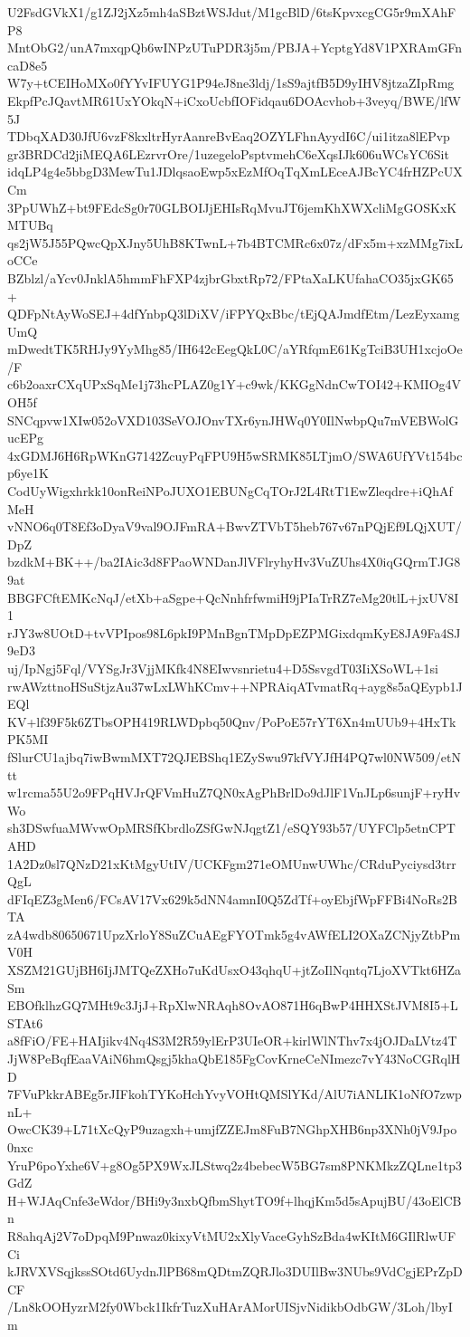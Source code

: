 U2FsdGVkX1/g1ZJ2jXz5mh4aSBztWSJdut/M1gcBlD/6tsKpvxcgCG5r9mXAhFP8
MntObG2/unA7mxqpQb6wINPzUTuPDR3j5m/PBJA+YcptgYd8V1PXRAmGFncaD8e5
W7y+tCEIHoMXo0fYYvIFUYG1P94eJ8ne3ldj/1sS9ajtfB5D9yIHV8jtzaZIpRmg
EkpfPcJQavtMR61UxYOkqN+iCxoUcbfIOFidqau6DOAcvhob+3veyq/BWE/lfW5J
TDbqXAD30JfU6vzF8kxltrHyrAanreBvEaq2OZYLFhnAyydI6C/ui1itza8lEPvp
gr3BRDCd2jiMEQA6LEzrvrOre/1uzegeloPsptvmehC6eXqsIJk606uWCsYC6Sit
idqLP4g4e5bbgD3MewTu1JDlqsaoEwp5xEzMfOqTqXmLEceAJBcYC4frHZPcUXCm
3PpUWhZ+bt9FEdcSg0r70GLBOIJjEHIsRqMvuJT6jemKhXWXcliMgGOSKxKMTUBq
qs2jW5J55PQwcQpXJny5UhB8KTwnL+7b4BTCMRc6x07z/dFx5m+xzMMg7ixLoCCe
BZblzl/aYcv0JnklA5hmmFhFXP4zjbrGbxtRp72/FPtaXaLKUfahaCO35jxGK65+
QDFpNtAyWoSEJ+4dfYnbpQ3lDiXV/iFPYQxBbc/tEjQAJmdfEtm/LezEyxamgUmQ
mDwedtTK5RHJy9YyMhg85/IH642cEegQkL0C/aYRfqmE61KgTciB3UH1xcjoOe/F
c6b2oaxrCXqUPxSqMe1j73hcPLAZ0g1Y+c9wk/KKGgNdnCwTOI42+KMIOg4VOH5f
SNCqpvw1XIw052oVXD103SeVOJOnvTXr6ynJHWq0Y0IlNwbpQu7mVEBWolGucEPg
4xGDMJ6H6RpWKnG7142ZcuyPqFPU9H5wSRMK85LTjmO/SWA6UfYVt154bcp6ye1K
CodUyWigxhrkk10onReiNPoJUXO1EBUNgCqTOrJ2L4RtT1EwZleqdre+iQhAfMeH
vNNO6q0T8Ef3oDyaV9val9OJFmRA+BwvZTVbT5heb767v67nPQjEf9LQjXUT/DpZ
bzdkM+BK++/ba2IAic3d8FPaoWNDanJlVFlryhyHv3VuZUhs4X0iqGQrmTJG89at
BBGFCftEMKcNqJ/etXb+aSgpe+QcNnhfrfwmiH9jPIaTrRZ7eMg20tlL+jxUV8I1
rJY3w8UOtD+tvVPIpos98L6pkI9PMnBgnTMpDpEZPMGixdqmKyE8JA9Fa4SJ9eD3
uj/IpNgj5Fql/VYSgJr3VjjMKfk4N8EIwvsnrietu4+D5SsvgdT03IiXSoWL+1si
rwAWzttnoHSuStjzAu37wLxLWhKCmv++NPRAiqATvmatRq+ayg8s5aQEypb1JEQl
KV+lf39F5k6ZTbsOPH419RLWDpbq50Qnv/PoPoE57rYT6Xn4mUUb9+4HxTkPK5MI
fSlurCU1ajbq7iwBwmMXT72QJEBShq1EZySwu97kfVYJfH4PQ7wl0NW509/etNtt
w1rcma55U2o9FPqHVJrQFVmHuZ7QN0xAgPhBrlDo9dJlF1VnJLp6sunjF+ryHvWo
sh3DSwfuaMWvwOpMRSfKbrdloZSfGwNJqgtZ1/eSQY93b57/UYFClp5etnCPTAHD
1A2Dz0sl7QNzD21xKtMgyUtIV/UCKFgm271eOMUnwUWhc/CRduPyciysd3trrQgL
dFIqEZ3gMen6/FCsAV17Vx629k5dNN4amnI0Q5ZdTf+oyEbjfWpFFBi4NoRs2BTA
zA4wdb80650671UpzXrloY8SuZCuAEgFYOTmk5g4vAWfELI2OXaZCNjyZtbPmV0H
XSZM21GUjBH6IjJMTQeZXHo7uKdUsxO43qhqU+jtZoIlNqntq7LjoXVTkt6HZaSm
EBOfklhzGQ7MHt9c3JjJ+RpXlwNRAqh8OvAO871H6qBwP4HHXStJVM8I5+LSTAt6
a8fFiO/FE+HAIjikv4Nq4S3M2R59ylErP3UIeOR+kirlWlNThv7x4jOJDaLVtz4T
JjW8PeBqfEaaVAiN6hmQsgj5khaQbE185FgCovKrneCeNImezc7vY43NoCGRqlHD
7FVuPkkrABEg5rJIFkohTYKoHchYvyVOHtQMSlYKd/AlU7iANLIK1oNfO7zwpnL+
OwcCK39+L71tXcQyP9uzagxh+umjfZZEJm8FuB7NGhpXHB6np3XNh0jV9Jpo0nxc
YruP6poYxhe6V+g8Og5PX9WxJLStwq2z4bebecW5BG7sm8PNKMkzZQLne1tp3GdZ
H+WJAqCnfe3eWdor/BHi9y3nxbQfbmShytTO9f+lhqjKm5d5sApujBU/43oElCBn
R8ahqAj2V7oDpqM9Pnwaz0kixyVtMU2xXlyVaceGyhSzBda4wKItM6GIlRlwUFCi
kJRVXVSqjkssSOtd6UydnJlPB68mQDtmZQRJlo3DUIlBw3NUbs9VdCgjEPrZpDCF
/Ln8kOOHyzrM2fy0Wbck1IkfrTuzXuHArAMorUISjvNidikbOdbGW/3Loh/lbyIm

